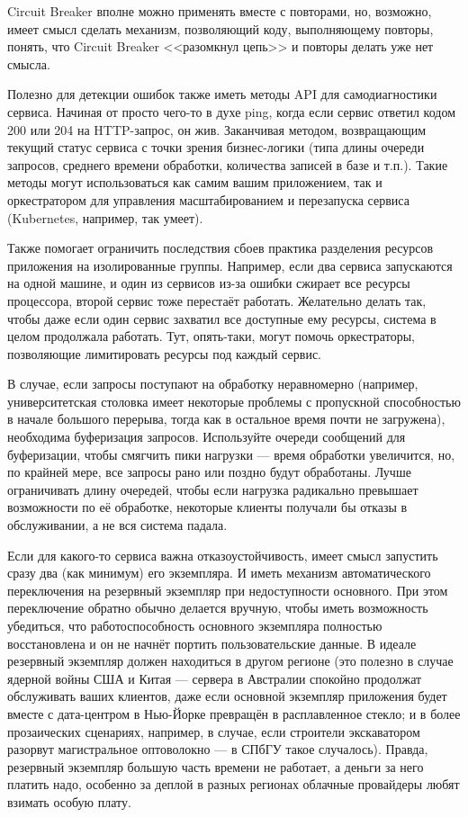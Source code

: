 \documentclass[a5paper]{article}
\begin{document}
Circuit Breaker вполне можно применять вместе с повторами, но, возможно, имеет смысл сделать механизм, позволяющий коду, выполняющему повторы, понять, что Circuit Breaker <<разомкнул цепь>> и повторы делать уже нет смысла.

Полезно для детекции ошибок также иметь методы API для самодиагностики сервиса. Начиная от просто чего-то в духе ping, когда если сервис ответил кодом 200 или 204 на HTTP-запрос, он жив. Заканчивая методом, возвращающим текущий статус сервиса с точки зрения бизнес-логики (типа длины очереди запросов, среднего времени обработки, количества записей в базе и т.п.). Такие методы могут использоваться как самим вашим приложением, так и оркестратором для управления масштабированием и перезапуска сервиса (Kubernetes, например, так умеет).

Также помогает ограничить последствия сбоев практика разделения ресурсов приложения на изолированные группы. Например, если два сервиса запускаются на одной машине, и один из сервисов из-за ошибки сжирает все ресурсы процессора, второй сервис тоже перестаёт работать. Желательно делать так, чтобы даже если один сервис захватил все доступные ему ресурсы, система в целом продолжала работать. Тут, опять-таки, могут помочь оркестраторы, позволяющие лимитировать ресурсы под каждый сервис.

В случае, если запросы поступают на обработку неравномерно (например, университетская столовка имеет некоторые проблемы с пропускной способностью в начале большого перерыва, тогда как в остальное время почти не загружена), необходима буферизация запросов. Используйте очереди сообщений для буферизации, чтобы смягчить пики нагрузки --- время обработки увеличится, но, по крайней мере, все запросы рано или поздно будут обработаны. Лучше ограничивать длину очередей, чтобы если нагрузка радикально превышает возможности по её обработке, некоторые клиенты получали бы отказы в обслуживании, а не вся система падала.

Если для какого-то сервиса важна отказоустойчивость, имеет смысл запустить сразу два (как минимум) его экземпляра. И иметь механизм автоматического переключения на резервный экземпляр при недоступности основного. При этом переключение обратно обычно делается вручную, чтобы иметь возможность убедиться, что работоспособность основного экземпляра полностью восстановлена и он не начнёт портить пользовательские данные. В идеале резервный экземпляр должен находиться в другом регионе (это полезно в случае ядерной войны США и Китая --- сервера в Австралии спокойно продолжат обслуживать ваших клиентов, даже если основной экземпляр приложения будет вместе с дата-центром в Нью-Йорке превращён в расплавленное стекло; и в более прозаических сценариях, например, в случае, если строители экскаватором разорвут магистральное оптоволокно --- в СПбГУ такое случалось). Правда, резервный экземпляр большую часть времени не работает, а деньги за него платить надо, особенно за деплой в разных регионах облачные провайдеры любят взимать особую плату.
\end{document}
